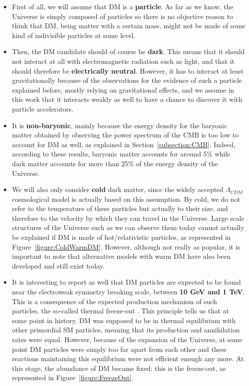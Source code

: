 \documentclass[a4paper, 10pt, openright]{report}
\begin{document}
\begin{itemize}
\item First of all, we will assume that \ac{DM} is a \textbf{particle}. As far as we know, the Universe is simply composed of particles so there is no objective reason to think that \ac{DM}, being matter with a certain mass, might not be made of some kind of indivisible particles at some level.
\item Then, the \ac{DM} candidate should of course be \textbf{dark}. This means that it should not interact at all with electromagnetic radiation such as light, and that it should therefore be \textbf{electrically neutral}. However, it has to interact at least gravitationally because of the observations for the evidence of such a particle explained before, mostly relying on gravitational effects, and we assume in this work that it interacts weakly as well to have a chance to discover it with particle accelerators.
\item It is \textbf{non-baryonic}, mainly because the energy density for the baryonic matter obtained by observing the power spectrum of the \ac{CMB} is too low to account for \ac{DM} as well, as explained in Section~\ref{subsection:CMB}. Indeed, according to these results, baryonic matter accounts for around 5\% while dark matter accounts for more than 25\% of the energy density of the Universe. 
\item We will also only consider \textbf{cold} dark matter, since the widely accepted $\Lambda_{CDM}$ cosmological model is actually based on this assumption. By cold, we do not refer to the temperature of these particles but actually to their size, and therefore to the velocity by which they can travel in the Universe. Large scale structures of the Universe such as we can observe them today cannot actually be explained if \ac{DM} is made of hot/relativistic particles, as represented in Figure~\ref{figure:ColdWarmDM}. However, although not really as popular, it is important to note that alternative models with warm \ac{DM} have also been developed and still exist today.
\item It is interesting to report as well that \ac{DM} particles are expected to be found near the electroweak symmetry breaking scale, between \textbf{10 GeV and 1 TeV}. This is a consequence of the expected production mechanism of such particles, the so-called thermal freeze-out \cite{Freezeout1}. This principle tells us that at some point in history, \ac{DM} was supposed to be in thermal equilibrium with other primordial \ac{SM} particles, meaning that its production and annihilation rates were equal. However, because of the expansion of the Universe, at some point \ac{DM} particles were simply too far apart from each other and these reactions maintaining this equilibrium were not efficient enough any more. At this stage, the abundance of \ac{DM} became fixed: this is the freeze-out, as represented in Figure~\ref{figure:FreezeOut}.


\end{itemize}
\end{document}
